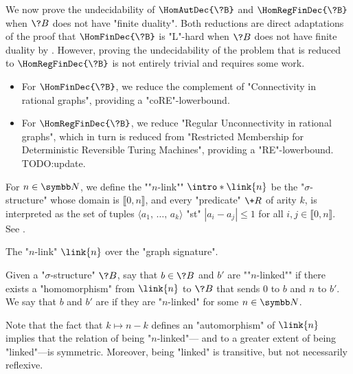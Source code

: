 We now prove the undecidability of $\HomAutDec{\?B}$ and $\HomRegFinDec{\?B}$
when $\?B$ does not have "finite duality". Both reductions are
direct adaptations of the proof that $\HomFinDec{\?B}$ is "L"-hard when $\?B$ does not
have finite duality by \textcite[Theorem 3.2]{LaroseTesson2009UniversalAlgebraCSP}.
However, proving the undecidability of the problem that is reduced
to $\HomRegFinDec{\?B}$ is not entirely trivial and requires some work.
\begin{itemize}
	\item For $\HomFinDec{\?B}$, we reduce the complement of "Connectivity in rational graphs",
		providing a "coRE"-lowerbound.
	\item For $\HomRegFinDec{\?B}$, we reduce "Regular Unconnectivity in rational graphs",
		which in turn is reduced from "Restricted Membership for Deterministic Reversible Turing Machines", providing a "RE"-lowerbound. TODO:update.
\end{itemize}

For $n\in\N$, we define the \AP""$n$-link"" $\intro*\link{n}$ be the "$\sigma$-structure" 
whose domain is $\lBrack 0,n\rBrack$, and every "predicate" $\+R$
of arity $k$, is interpreted as the set of tuples $\langle a_1,\, \hdots,\, a_k \rangle$
"st" $|a_i-a_j| \leq 1$ for all $i,j \in \lBrack 0,n \rBrack$. See .
\begin{marginfigure}
	\centering
	\begin{tikzpicture}
		
	\end{tikzpicture}
	\caption{\AP\label{fig:n-link}The "$n$-link" $\link{n}$ over the "graph signature".}
\end{marginfigure}
Given a "$\sigma$-structure" $\?B$, say that $b \in \?B$ and $b'$ are
\AP""$n$-linked"" if there exists a "homomorphism" from $\link{n}$ to $\?B$
that sends $0$ to $b$ and $n$ to $b'$. We say that $b$ and $b'$ are \AP{} if
they are "$n$-linked" for some $n \in \N$.

Note that the fact that $k \mapsto n-k$
defines an "automorphism" of $\link{n}$ implies that the relation of being "$n$-linked"---%
and to a greater extent of being "linked"---is symmetric.
Moreover, being "linked" is transitive, but not necessarily reflexive.

